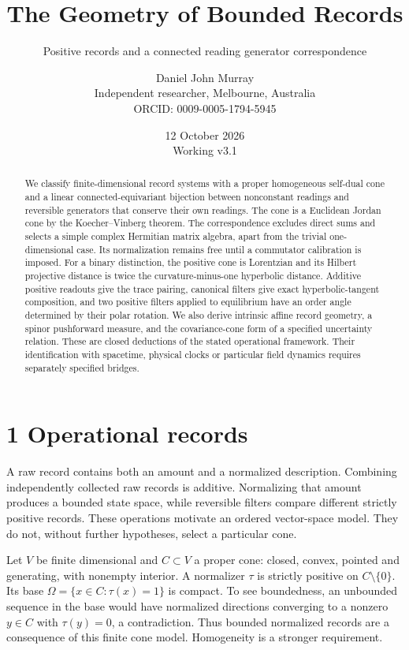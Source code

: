 \documentclass[
  11pt,
  a4paper,
]{article}
\title{The Geometry of Bounded Records}
\subtitle{Positive records and a connected reading generator correspondence}
\author{Daniel John Murray\\{\small Independent researcher, Melbourne, Australia}\\{\small ORCID: 0009-0005-1794-5945}}
\date{12 October 2026\\{\small Working v3.1}}
\newcounter{none} %
\begin{document}
\maketitle
\begin{abstract}
We classify finite-dimensional record systems with a proper homogeneous self-dual cone and a linear connected-equivariant bijection between nonconstant readings and reversible generators that conserve their own readings. The cone is a Euclidean Jordan cone by the Koecher--Vinberg theorem. The correspondence excludes direct sums and selects a simple complex Hermitian matrix algebra, apart from the trivial one-dimensional case. Its normalization remains free until a commutator calibration is imposed. For a binary distinction, the positive cone is Lorentzian and its Hilbert projective distance is twice the curvature-minus-one hyperbolic distance. Additive positive readouts give the trace pairing, canonical filters give exact hyperbolic-tangent composition, and two positive filters applied to equilibrium have an order angle determined by their polar rotation. We also derive intrinsic affine record geometry, a spinor pushforward measure, and the covariance-cone form of a specified uncertainty relation. These are closed deductions of the stated operational framework. Their identification with spacetime, physical clocks or particular field dynamics requires separately specified bridges.
\end{abstract}

\section{1 Operational records}\label{operational-records}

A raw record contains both an amount and a normalized description. Combining independently collected raw records is additive. Normalizing that amount produces a bounded state space, while reversible filters compare different strictly positive records. These operations motivate an ordered vector-space model. They do not, without further hypotheses, select a particular cone.

Let \(V\) be finite dimensional and \(C\subset V\) a proper cone: closed, convex, pointed and generating, with nonempty interior. A normalizer \(\tau\) is strictly positive on \(C\setminus\{0\}\). Its base \(\Omega=\{x\in C:\tau(x)=1\}\) is compact. To see boundedness, an unbounded sequence in the base would have normalized directions converging to a nonzero \(y\in C\) with \(\tau(y)=0\), a contradiction. Thus bounded normalized records are a consequence of this finite cone model. Homogeneity is a stronger requirement.
\end{document}
